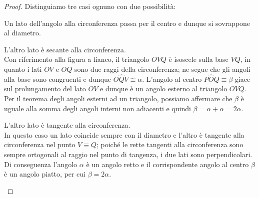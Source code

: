 \begin{proof}
Distinguiamo tre casi ognuno con due possibilità:
\begin{enumerate*}
\item Un lato dell'angolo alla circonferenza passa per il centro e 
dunque si sovrappone al diametro.
\begin{enumerate*}
\noindent\begin{minipage}{0.6\textwidth}\parindent15pt
\item L'altro lato è secante alla circonferenza.\\
Con riferimento alla figura a fianco, il triangolo $OVQ$ è isoscele 
sulla base $VQ$, in quanto i lati $OV$ e $OQ$ sono due raggi della 
circonferenza; ne segue che gli angoli alla base sono congruenti e 
dunque $O\widehat{Q}V\cong \alpha$. L'angolo al centro 
$P\widehat{O}Q\equiv \beta$ giace sul prolungamento del lato $OV$ e 
dunque è un angolo esterno al triangolo $OVQ$. Per il teorema degli 
angoli esterni ad un triangolo, possiamo affermare che $\beta$ è 
uguale alla somma degli angoli interni non adiacenti e quindi $\beta 
= \alpha + \alpha = 2\alpha$.
\end{minipage}\hfil
\noindent\hspace{-20pt}\begin{minipage}{0.4\textwidth}
  \centering
\end{minipage}
\noindent\begin{minipage}{0.6\textwidth}\parindent15pt
\item L'altro lato è tangente alla circonferenza.\\
In questo caso un lato coincide sempre con il diametro e l'altro è 
tangente alla circonferenza nel punto $V\equiv Q$; poiché le rette 
tangenti alla circonferenza sono sempre ortogonali al raggio nel 
punto di tangenza, i due lati sono perpendicolari. Di conseguenza 
l'angolo $\alpha$ è un angolo retto e il corrispondente angolo al 
centro $\beta$ è un angolo piatto, per cui $\beta = 2\alpha$.
\end{minipage}\hfil
\noindent\hspace{-20pt}\begin{minipage}{0.4\textwidth}
  \centering
\end{minipage}
\end{enumerate*}


\end{enumerate*}
\end{proof}
